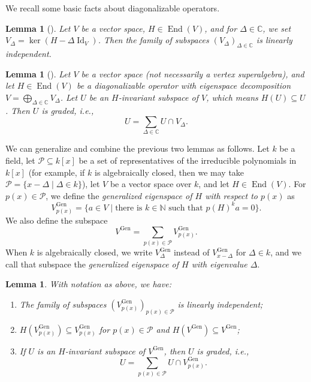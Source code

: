 \documentclass[a4paper, 12pt, reqno]{amsart}
\newtheorem{lemma}[theorem]{Lemma}
\theoremstyle{remark}
\DeclareMathOperator{\Id}{Id}
\DeclareMathOperator{\End}{End}
\DeclareMathOperator{\Gen}{Gen}
\begin{document}
We recall some basic facts about diagonalizable operators.

\begin{lemma}[{\cite[\S6.2]{hoffman_linear_1971}}]
  \label{lmm:8}
  Let $V$ be a vector space, $H \in \End(V)$, and for $\Delta \in \mathbb{C}$, we set $V_{\Delta} = \ker(H - \Delta\Id_V)$.
  Then the family of subspaces $(V_{\Delta})_{\Delta \in \mathbb{C}}$ is linearly independent.
\end{lemma}

\begin{lemma}[{\cite[Corollary 1.1]{kac_bombay_2013}}]
  \label{lmm:9}
  Let $V$ be a vector space (not necessarily a vertex superalgebra), and let $H \in \End(V)$ be a diagonalizable operator with eigenspace decomposition $V = \bigoplus_{\Delta \in \mathbb{C}}V_{\Delta}$.
  Let $U$ be an $H$-invariant subspace of $V$, which means $H(U) \subseteq U$.
  Then $U$ is graded, i.e.,
  \begin{equation*}
    U = \sum_{\Delta \in \mathbb{C}}U \cap V_{\Delta}.
  \end{equation*}
\end{lemma}

We can generalize and combine the previous two lemmas as follows.
Let $k$ be a field, let $\mathcal{P} \subseteq k[x]$ be a set of representatives of the irreducible polynomials in $k[x]$ (for example, if $k$ is algebraically closed, then we may take $\mathcal{P} = \{x - \Delta \mid \Delta \in k\}$), let $V$ be a vector space over $k$, and let $H \in \End(V)$.
For $p(x) \in \mathcal{P}$, we define the \emph{generalized eigenspace of $H$ with respect to $p(x)$} as
\begin{equation*}
  V^{\Gen}_{p(x)} = \{a \in V \mid \text{there is $k \in \mathbb{N}$ such that $p(H)^ka = 0$}\}.
\end{equation*}
We also define the subspace
\begin{equation*}
  V^{\Gen} = \sum_{p(x) \in \mathcal{P}}V^{\Gen}_{p(x)}.
\end{equation*}
When $k$ is algebraically closed, we write $V^{\Gen}_{\Delta}$ instead of $V^{\Gen}_{x - \Delta}$ for $\Delta \in k$, and we call that subspace the \emph{generalized eigenspace of $H$ with eigenvalue $\Delta$}.

\begin{lemma}
  \label{lmm:10}
  With notation as above, we have:
  \begin{enumerate}
  \item The family of subspaces $(V^{\Gen}_{p(x)})_{p(x) \in \mathcal{P}}$ is linearly independent;
  \item $H(V^{\Gen}_{p(x)}) \subseteq V^{\Gen}_{p(x)}$ for $p(x) \in \mathcal{P}$ and $H(V^{\Gen}) \subseteq V^{\Gen}$;
  \item If $U$ is an $H$-invariant subspace of $V^{\Gen}$, then $U$ is graded, i.e.,
    \begin{equation*}
      U = \sum_{p(x) \in \mathcal{P}}U \cap V^{\Gen}_{p(x)}.
    \end{equation*}
  \end{enumerate}
\end{lemma}
\end{document}
